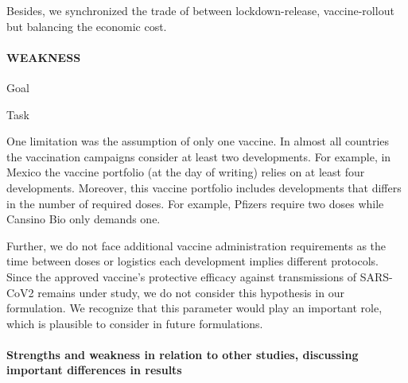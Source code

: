             Besides, we synchronized the trade of between
        lockdown-release, vaccine-rollout but balancing the 
        economic cost.

    \paragraph[]{WEAKNESS}
        \begin{CheckList}{Goal}
                \begin{CheckList}{Task}
                \end{CheckList}
        \end{CheckList}
  
            One limitation was the assumption of only one vaccine. 
        In almost all countries the vaccination campaigns consider at 
        least two developments. For example, in Mexico the vaccine portfolio 
        (at the day of writing) relies on at least four developments. Moreover, 
        this vaccine portfolio includes developments that differs in the number 
        of required doses. For example, Pfizers require two doses while Cansino 
        Bio only demands one.
        
            Further, we do not face additional vaccine administration 
        requirements as the time between doses or logistics\textemdash 
        each development implies different protocols. Since the approved 
        vaccine's protective efficacy against transmissions of SARS-CoV2 
        remains under study, we do not consider this hypothesis in our
        formulation. We recognize that this parameter would play an 
        important role, which is plausible to consider in future formulations.

    \paragraph{Strengths and weakness in relation to 
        other studies, discussing important differences
        in results
    }
